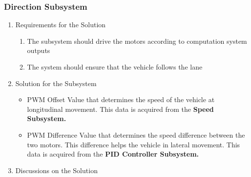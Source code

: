 \documentclass[a4paper,12pt]{article}
\begin{document}
\subsubsection{Direction Subsystem}

	\begin{enumerate}
		\item {Requirements for the Solution}
		
		\begin{enumerate}
			\item The subsystem should drive the motors according to computation system outputs
			\item The system should ensure that the vehicle follows the lane 	
		\end{enumerate}

		\item {Solution for the Subsystem}


		\begin{itemize}
			\item PWM Offset Value that determines the speed of the vehicle at longitudinal movement. This data is acquired from the \textbf{Speed Subsystem.} 	
			\item PWM Difference Value that determines the speed difference between the two motors. This difference helps the vehicle in lateral movement. This data is acquired from the \textbf{PID Controller Subsystem.} 	
		\end{itemize}	




	\item {Discussions on the Solution}


	\end{enumerate}


\end{document}
